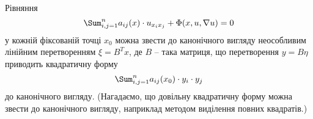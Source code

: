 Рівняння 
\begin{equation}
    \label{eq:2.1}
    \Sum_{i, j = 1}^n a_{i j}(x) \cdot u_{x_i x_j} + \Phi(x, u, \nabla u) = 0
\end{equation}
у кожній фіксованій точці $x_0$ можна звести до канонічного вигляду неособливим лінійним перетворенням $\xi = B^T x$, де $B$ -- така матриця, що перетворення $y = B \eta$ приводить квадратичну форму
\begin{equation}
    \label{eq:2.2}
    \Sum_{i, j = 1}^n a_{i j}(x_0) \cdot y_i \cdot y_j
\end{equation}
до канонічного вигляду. (Нагадаємо, що довільну квадратичну форму можна звести до канонічного вигляду, наприклад методом виділення повних квадратів.)
